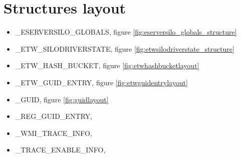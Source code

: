 \section{Structures layout}
\begin{itemize}
\item \_ESERVERSILO\_GLOBALS, figure \ref{fig:eserversilo_globals_structure}
\item \_ETW\_SILODRIVERSTATE, figure \ref{fig:etwsilodriverstate_structure}
\item \_ETW\_HASH\_BUCKET, figure \ref{fig:etwhashbucketlayout}
\item \_ETW\_GUID\_ENTRY, figure \ref{fig:etwguidentrylayout}
\item \_GUID, figure \ref{fig:guidlayout}  
\item \_REG\_GUID\_ENTRY,
\item \_WMI\_TRACE\_INFO, 
\item \_TRACE\_ENABLE\_INFO,
\end{itemize}

